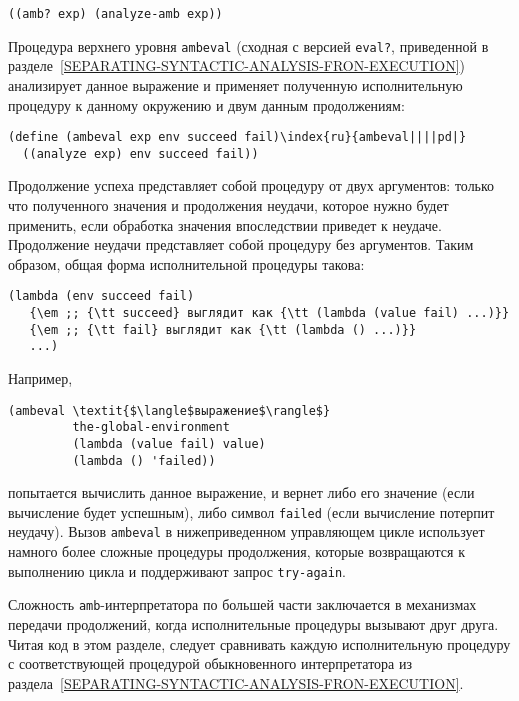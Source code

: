 \begin{Verbatim}[fontsize=\small]
((amb? exp) (analyze-amb exp))
\end{Verbatim}

Процедура верхнего уровня {\tt ambeval} (сходная с
версией {\tt eval?}, приведенной в 
разделе~\ref{SEPARATING-SYNTACTIC-ANALYSIS-FRON-EXECUTION})
анализирует данное выражение и применяет полученную исполнительную
процедуру к данному окружению и двум данным 
продолжениям:

\begin{Verbatim}[fontsize=\small]
(define (ambeval exp env succeed fail)\index{ru}{ambeval||||pd|}
  ((analyze exp) env succeed fail))
\end{Verbatim}

Продолжение успеха представляет собой процедуру 
от двух
аргументов: только что полученного значения и продолжения неудачи,
которое нужно будет применить, если обработка значения впоследствии приведет
к неудаче.  Продолжение неудачи представляет собой процедуру без
аргументов.  Таким образом, общая форма  исполнительной процедуры
такова:
 
\begin{Verbatim}[fontsize=\small]
(lambda (env succeed fail)
   {\em ;; {\tt succeed} выглядит как {\tt (lambda (value fail) ...)}}
   {\em ;; {\tt fail} выглядит как {\tt (lambda () ...)}}
   ...)
\end{Verbatim}

Например,

\begin{Verbatim}[fontsize=\small]
(ambeval \textit{$\langle$выражение$\rangle$}
         the-global-environment
         (lambda (value fail) value)
         (lambda () 'failed))
\end{Verbatim}
попытается вычислить данное выражение, и вернет либо его значение
(если вычисление будет успешным), либо символ 
{\tt failed} (если вычисление потерпит неудачу).  Вызов
{\tt ambeval} в нижеприведенном управляющем цикле использует
намного более сложные процедуры продолжения, которые возвращаются к 
выполнению цикла и поддерживают запрос {\tt try-again}.

Сложность {\tt amb}-интерпретатора по большей части
заключается в механизмах передачи продолжений, когда исполнительные
процедуры вызывают друг друга.  Читая код в этом разделе, следует
сравнивать каждую исполнительную процедуру с соответствующей процедурой
обыкновенного интерпретатора из 
раздела~\ref{SEPARATING-SYNTACTIC-ANALYSIS-FRON-EXECUTION}.

